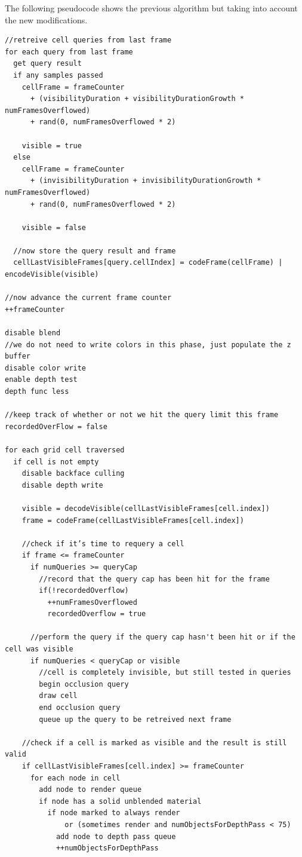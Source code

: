 \documentclass[12pt]{ucthesis}
\begin{document}
The following pseudocode shows the previous algorithm but taking into account the new modifications.
\begin{lstlisting}
//retreive cell queries from last frame
for each query from last frame
  get query result
  if any samples passed
    cellFrame = frameCounter 
      + (visibilityDuration + visibilityDurationGrowth * numFramesOverflowed) 
      + rand(0, numFramesOverflowed * 2)

    visible = true
  else
    cellFrame = frameCounter 
      + (invisibilityDuration + invisibilityDurationGrowth * numFramesOverflowed) 
      + rand(0, numFramesOverflowed * 2)
    
    visible = false

  //now store the query result and frame
  cellLastVisibleFrames[query.cellIndex] = codeFrame(cellFrame) | encodeVisible(visible)

//now advance the current frame counter
++frameCounter

disable blend
//we do not need to write colors in this phase, just populate the z buffer
disable color write
enable depth test
depth func less

//keep track of whether or not we hit the query limit this frame
recordedOverFlow = false

for each grid cell traversed
  if cell is not empty
    disable backface culling
    disable depth write

    visible = decodeVisible(cellLastVisibleFrames[cell.index])
    frame = codeFrame(cellLastVisibleFrames[cell.index]) 

    //check if it’s time to requery a cell
    if frame <= frameCounter
      if numQueries >= queryCap
        //record that the query cap has been hit for the frame
        if(!recordedOverflow)
          ++numFramesOverflowed
          recordedOverflow = true

      //perform the query if the query cap hasn't been hit or if the cell was visible
      if numQueries < queryCap or visible
        //cell is completely invisible, but still tested in queries
        begin occlusion query
        draw cell
        end occlusion query
        queue up the query to be retreived next frame

    //check if a cell is marked as visible and the result is still valid
    if cellLastVisibleFrames[cell.index] >= frameCounter
      for each node in cell
        add node to render queue
        if node has a solid unblended material
          if node marked to always render 
              or (sometimes render and numObjectsForDepthPass < 75)
            add node to depth pass queue
            ++numObjectsForDepthPass


\end{lstlisting}
\end{document}
